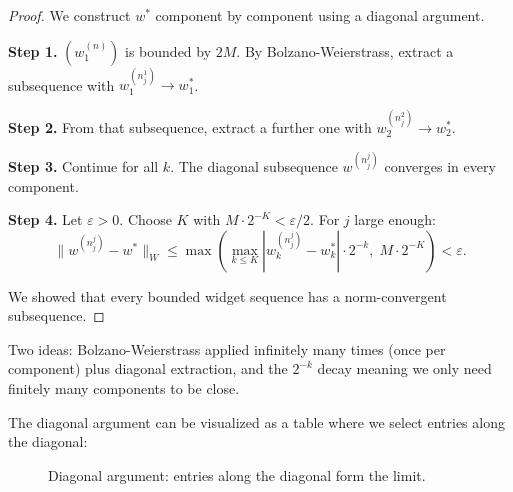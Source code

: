 \documentclass[10pt, a4paper]{article}
\theoremstyle{definition}
\theoremstyle{remark}
\newcommand{\eps}{\varepsilon}
\begin{document}
\begin{proof}
We construct $w^*$ component by component using a diagonal argument.

\textbf{Step 1.}
$(w^{(n)}_1)$ is bounded by $2M$.
By Bolzano-Weierstrass, extract a subsequence with $w^{(n^1_j)}_1 \to w^*_1$.

\textbf{Step 2.}
From that subsequence, extract a further one with $w^{(n^2_j)}_2 \to w^*_2$.

\textbf{Step 3.}
Continue for all $k$. The diagonal subsequence $w^{(n^j_j)}$
converges in every component.

\textbf{Step 4.}
Let $\eps > 0$. Choose $K$ with $M \cdot 2^{-K} < \eps/2$.
For $j$ large enough:
\[
  \|w^{(n^j_j)} - w^*\|_W
  \le \max\!\left(\max_{k \le K} |w^{(n^j_j)}_k - w^*_k| \cdot 2^{-k},\;
       M \cdot 2^{-K}\right) < \eps.
\]

We showed that every bounded widget sequence has a norm-convergent
subsequence.
\end{proof}

\begin{whybox}[Intuition]
Two ideas: Bolzano-Weierstrass applied infinitely many times
(once per component) plus diagonal extraction, and the $2^{-k}$ decay
meaning we only need finitely many components to be close.
\end{whybox}


The diagonal argument can be visualized as a table where we select
entries along the diagonal:

\begin{figure}[H]
\centering
{}
\caption{Diagonal argument: entries along the diagonal form the limit.}\label{fig:diagonal}
\end{figure}
\end{document}
